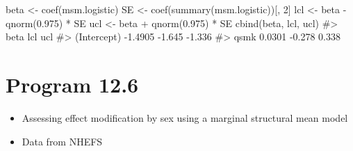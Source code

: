 \documentclass[
  10pt,
  a4paper,
]{book}
\newenvironment{Shaded}{\begin{snugshade}}{\end{snugshade}}
\newcommand{\CommentTok}[1]{\textcolor[rgb]{0.37,0.37,0.37}{#1}}
\newcommand{\DecValTok}[1]{\textcolor[rgb]{0.68,0.00,0.00}{#1}}
\newcommand{\FloatTok}[1]{\textcolor[rgb]{0.68,0.00,0.00}{#1}}
\newcommand{\FunctionTok}[1]{\textcolor[rgb]{0.28,0.35,0.67}{#1}}
\newcommand{\NormalTok}[1]{\textcolor[rgb]{0.00,0.46,0.62}{#1}}
\newcommand{\OtherTok}[1]{\textcolor[rgb]{0.00,0.46,0.62}{#1}}
\newcommand{\SpecialCharTok}[1]{\textcolor[rgb]{0.37,0.37,0.37}{#1}}
\providecommand{\tightlist}{%
  \setlength{\itemsep}{0pt}\setlength{\parskip}{0pt}}
\begin{document}
\begin{Shaded}
\begin{Highlighting}[]
\NormalTok{beta }\OtherTok{\textless{}{-}} \FunctionTok{coef}\NormalTok{(msm.logistic)}
\NormalTok{SE }\OtherTok{\textless{}{-}} \FunctionTok{coef}\NormalTok{(}\FunctionTok{summary}\NormalTok{(msm.logistic))[, }\DecValTok{2}\NormalTok{]}
\NormalTok{lcl }\OtherTok{\textless{}{-}}\NormalTok{ beta }\SpecialCharTok{{-}} \FunctionTok{qnorm}\NormalTok{(}\FloatTok{0.975}\NormalTok{) }\SpecialCharTok{*}\NormalTok{ SE}
\NormalTok{ucl }\OtherTok{\textless{}{-}}\NormalTok{ beta }\SpecialCharTok{+} \FunctionTok{qnorm}\NormalTok{(}\FloatTok{0.975}\NormalTok{) }\SpecialCharTok{*}\NormalTok{ SE}
\FunctionTok{cbind}\NormalTok{(beta, lcl, ucl)}
\CommentTok{\#\textgreater{}                beta    lcl    ucl}
\CommentTok{\#\textgreater{} (Intercept) {-}1.4905 {-}1.645 {-}1.336}
\CommentTok{\#\textgreater{} qsmk         0.0301 {-}0.278  0.338}
\end{Highlighting}
\end{Shaded}

\section{Program 12.6}\label{program-12.6}

\begin{itemize}
\tightlist
\item
  Assessing effect modification by sex using a marginal structural mean model
\item
  Data from NHEFS
\end{itemize}
\end{document}
